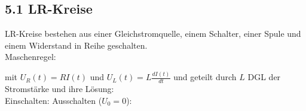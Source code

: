 \subsection{5.1 LR-Kreise}
    LR-Kreise bestehen aus einer Gleichstromquelle, einem Schalter, einer Spule und einem Widerstand in Reihe geschalten.\\
    Maschenregel:

    mit $U_R(t) = R I(t)$ und $U_L(t) = L \frac{dI(t)}{dt}$ und geteilt durch $L$
    DGL der Stromstärke und ihre Lösung:\\
    Einschalten:
    Ausschalten ($U_0 = 0$):
